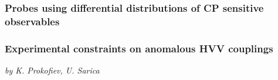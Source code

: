 \subsubsection{Probes using differential distributions of CP sensitive observables}


\subsubsection{Experimental constraints on anomalous HVV couplings}
\begin{center}{\it by K. Prokofiev, U. Sarica} \end{center}
\label{subsection:ACHVVdecay}



